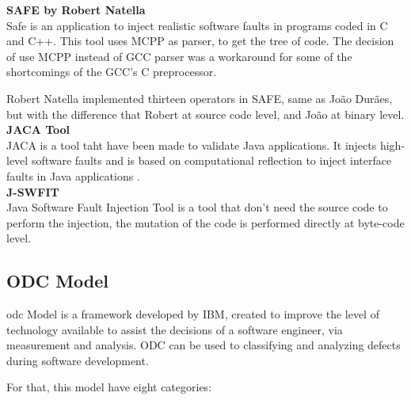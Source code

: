 \textbf{SAFE by Robert Natella}\\

Safe is an application to inject realistic software faults in programs coded in C and C++.
This tool uses MCPP as parser, to get the tree of code. The decision of use MCPP instead of GCC parser was a workaround for some of the shortcomings of the GCC's C preprocessor.

Robert Natella implemented thirteen operators in SAFE, same as João Durães\cite{duraes2006emulation}, but with the difference that Robert  at source code level, and João at binary level.\\


\textbf{JACA Tool}\\

JACA\cite{regina2003jaca} is a tool taht have been made to validate Java applications. It injects high-level software faults and is based on computational reflection to inject interface faults in Java applications
\cite{martins2002jaca}. \\

\textbf{J-SWFIT} \\

Java Software Fault Injection Tool\cite{sanches2011j} is a tool that don't need the source code to perform the injection, the mutation of the code is performed directly at byte-code level.

\clearpage
\subsection{ODC Model}
\ac{odc}\cite{bridge1998orthogonal} Model is a framework developed by IBM\cite{chillarege2004orthogonal}, created to improve the level of technology available to assist the decisions of a software engineer, via measurement and analysis.
ODC can be used to classifying and analyzing defects during software development.

For that, this model have eight categories:

